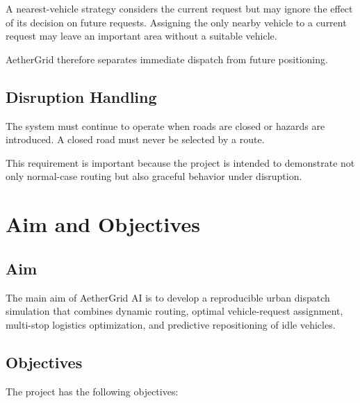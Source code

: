 \documentclass[12pt,a4paper]{article}
\begin{document}
A nearest-vehicle strategy considers the current request but may
ignore the effect of its decision on future requests. Assigning the
only nearby vehicle to a current request may leave an important area
without a suitable vehicle.

AetherGrid therefore separates immediate dispatch from future
positioning.

\subsection{Disruption Handling}

The system must continue to operate when roads are closed or hazards
are introduced. A closed road must never be selected by a route.

This requirement is important because the project is intended to
demonstrate not only normal-case routing but also graceful behavior
under disruption.





\section{Aim and Objectives}

\subsection{Aim}

The main aim of AetherGrid AI is to develop a reproducible urban
dispatch simulation that combines dynamic routing, optimal
vehicle-request assignment, multi-stop logistics optimization, and
predictive repositioning of idle vehicles.

\subsection{Objectives}

The project has the following objectives:
\end{document}
